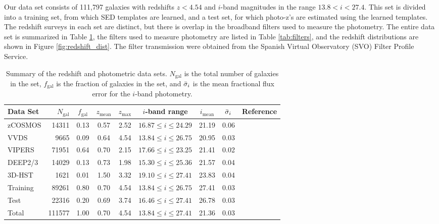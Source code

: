 
Our data set consists of 111,797 galaxies with redshifts $z < 4.54$ and $i$-band magnitudes in the range $13.8 < i < 27.4$. 
This set is divided into a training set, from which SED templates are learned, and a test set, for which photo-z's are estimated using the learned templates. 
The redshift surveys in each set are distinct, but there is overlap in the broadband filters used to measure the photometry.
The entire data set is summarized in Table \ref{tab:data_sets}, the filters used to measure photometry are listed in Table \ref{tab:filters}, and the redshift distributions are shown in Figure \ref{fig:redshift_dist}.
The filter transmission were obtained from the Spanish Virtual Observatory (SVO) Filter Profile Service.

\begin{table}
    \centering
    \caption{Summary of the redshift and photometric data sets. $N_\text{gal}$ is the total number of galaxies in the set, $f_\text{gal}$ is the fraction of galaxies in the set, and $\Bar{\sigma}_i$ is the mean fractional flux error for the $i$-band photometry. }
    \begin{tabular}{l r c c c c c c l}
        \hline \hline
        Data Set & $N_\text{gal}$ & $f_\text{gal}$ & $z_\text{mean}$ & $z_\text{max}$ & $i$-band range & $i_\text{mean}$ & $\Bar{\sigma}_i$ & Reference \\
        \hline
        
        zCOSMOS  &  14311 & 0.13 & 0.57 & 2.52 & $16.87 \leq i \leq 24.29$ & 21.19 & 0.06 & \citet{Lilly2009a} \\
        VVDS     &   9665 & 0.09 & 0.64 & 4.54 & $13.84 \leq i \leq 26.75$ & 20.95 & 0.03 & \citet{LeFevre2013b} \\
        VIPERS   &  71951 & 0.64 & 0.70 & 2.15 & $17.66 \leq i \leq 23.25$ & 21.41 & 0.02 & \citet{Scodeggio2018a} \\
        DEEP2/3  &  14029 & 0.13 & 0.73 & 1.98 & $15.30 \leq i \leq 25.36$ & 21.57 & 0.04 & \citet{Zhou2019a,Newman2013b} \\
        3D-HST   &   1621 & 0.01 & 1.50 & 3.32 & $19.10 \leq i \leq 27.41$ & 23.83 & 0.04 & \citet{Zhou2019a,Momcheva2016b}\\
        \hline
        Training &  89261 & 0.80 & 0.70 & 4.54 & $13.84 \leq i \leq 26.75$ & 27.41 & 0.03 \\
        Test     &  22316 & 0.20 & 0.69 & 3.74 & $16.46 \leq i \leq 27.41$ & 26.78 & 0.03 \\
        \hline
        Total    & 111577 & 1.00 & 0.70 & 4.54 & $13.84 \leq i \leq 27.41$ & 21.36 & 0.03 \\
        
        \hline
    \end{tabular}
    \label{tab:data_sets}
\end{table}

